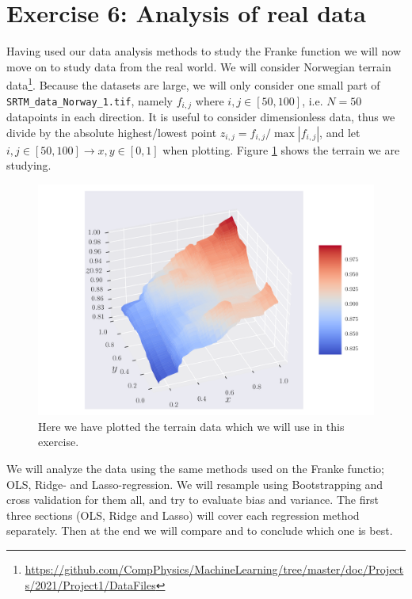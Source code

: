 \documentclass[reprint,english,notitlepage,aps,nobalancelastpage,nofootinbib]{revtex4-1}  %
\begin{document}
\section*{Exercise 6: Analysis of real data}
Having used our data analysis methods to study the Franke function we will now move on to study data from the real world. We will consider Norwegian terrain data\footnote{\href{https://github.com/CompPhysics/MachineLearning/tree/master/doc/Projects/2021/Project1/DataFiles}{https://github.com/CompPhysics/MachineLearning/tree/master/doc/Projects/2021/Project1/DataFiles}}. Because the datasets are large, we will only consider one small part of \texttt{SRTM\_data\_Norway\_1.tif}, namely $f_{i,j}$ where $i,j\in[50,100]$, i.e. $N=50$ datapoints in each direction. It is useful to consider dimensionless data, thus we divide by the absolute highest/lowest point $z_{i,j} = f_{i,j}/\max{|f_{i,j}|}$, and let $i,j\in[50,100] \rightarrow x,y\in[0,1]$ when plotting. Figure \ref{fig:terrain_raw} shows the terrain we are studying.

\begin{figure}[h]
	\includegraphics[width=\linewidth]{SRTM_rawdata_n50.pdf}
	\caption{Here we have plotted the terrain data which we will use in this exercise.}
	\label{fig:terrain_raw}
\end{figure}

We will analyze the data using the same methods used on the Franke functio; OLS, Ridge- and Lasso-regression. We will resample using Bootstrapping and cross validation for them all, and try to evaluate bias and variance. The first three sections (OLS, Ridge and Lasso) will cover each regression method separately. Then at the end we will compare and to conclude which one is best.
\end{document}
